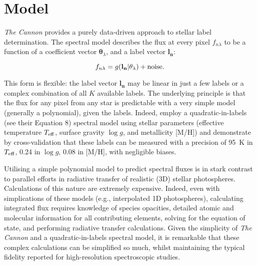 \documentclass[useAMS,usenatbib]{mn2e}
\newcommand\tc{\textit{The Cannon}}
\newcommand\lv{\mathbf{l_n}}
\newcommand\cv{{\mathbf \theta}_\lambda}
\newcommand\given{|}
\begin{document}
\section{Model}


\tc{} provides a purely data-driven approach to stellar label determination. The
spectral model describes the flux at every pixel $f_{n\lambda}$ to be a function
of a coefficient vector $\cv$, and a label vector $\lv$:

\begin{equation}
    f_{n\lambda} = g(\lv\given\cv) + {\rm noise}.
\end{equation}

This form is flexible: the label vector $\lv$ may be linear in just a few labels
or a complex combination of all $K$ available labels. The underlying principle
is that the flux for any pixel from any star is predictable with a very simple
model (generally a polynomial), given the labels. Indeed, \citet{Ness2015}
employ a quadratic-in-labels (see their Equation 8) spectral model using stellar
parameters (effective temperature $T_{\rm eff}$, surface gravity $\log{g}$, and 
metallicity [M/H]) and demonstrate by cross-validation that these labels can be 
measured with a precision of 95~K in $T_{\rm eff}$, 0.24 in $\log{g}$, 0.08 in 
[M/H], with negligible biases.

Utilising a simple polynomial model to predict spectral fluxes is in stark
contrast to parallel efforts in radiative transfer of realistic (3D) stellar 
photospheres. Calculations of this nature are extremely expensive. Indeed, even
with simplications of these models (e.g., interpolated 1D photospheres),
calculating integrated flux requires knowledge of species opacities, detailed 
atomic and molecular information for all contributing elements, solving for
the equation of state, and performing radiative transfer calculations. Given the
simplicity of \tc{} and a quadratic-in-labels spectral model, it is remarkable
that these complex calculations can be simplified so much, whilst maintaining
the typical fidelity reported for high-resolution spectroscopic studies.





\end{document}
